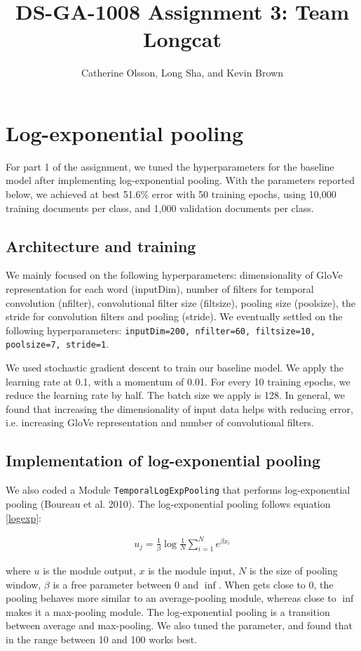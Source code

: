 \documentclass{article}
\title{DS-GA-1008 Assignment 3: Team Longcat}
\author{Catherine Olsson, Long Sha, and Kevin Brown}
\begin{document}
 \maketitle

\section{Log-exponential pooling}

For part 1 of the assignment, we tuned the hyperparameters for the baseline model after implementing log-exponential pooling. With the parameters reported below, we achieved at best 51.6\% error with 50 training epochs, using 10,000 training documents per class, and 1,000 validation documents per class. 

\subsection{Architecture and training}
We mainly focused on the following hyperparameters: dimensionality of GloVe representation for each word (inputDim), number of filters for temporal convolution (nfilter), convolutional filter size (filtsize), pooling size (poolsize), the stride for convolution filters and pooling (stride). We eventually settled on the following hyperparameters: \texttt{inputDim=200, nfilter=60, filtsize=10, poolsize=7, stride=1}.

We used stochastic gradient descent to train our baseline model. We apply the learning rate at 0.1, with a momentum of 0.01. For every 10 training epochs, we reduce the learning rate by half. The batch size we apply is 128. In general, we found that increasing the dimensionality of input data helps with reducing error, i.e. increasing GloVe representation and number of convolutional filters. 

\subsection{Implementation of log-exponential pooling} 

We also coded a Module \texttt{TemporalLogExpPooling} that performs log-exponential pooling (Boureau et al. 2010). The log-exponential pooling follows equation \ref{logexp}:

\begin{align}
u_j = \frac{1}{\beta} \log{\frac{1}{N} \sum\limits_{i=1}^{N} e^{\beta x_i}}
\label{logexp}
\end{align}

where $u$ is the module output, $x$ is the module input, $N$ is the size of pooling window, $\beta$ is a free parameter between 0 and $\inf$. When  gets close to 0, the pooling behaves more similar to an average-pooling module, whereas close to $\inf$ makes it a max-pooling module. The log-exponential pooling is a transition between average and max-pooling. We also tuned the  parameter, and found that  in the range between 10 and 100 works best. 
\end{document}
